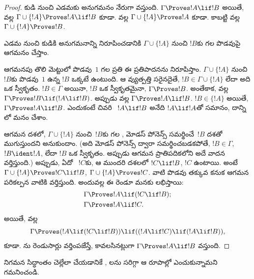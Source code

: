 \documentclass[../../../include/open-logic-section]{subfiles}
\begin{document}
\begin{proof}
కుడి నుంచి ఎడమకు అనుగమనం నేరుగా వస్తుంది. $\Gamma \Proves !A \lif !B$ అయితే,
 వల్ల $\Gamma \cup \{!A\} \Proves !A
\lif !B$ కూడా.  వల్ల $\Gamma \cup
\{!A\} \Proves !A$ కూడా. కాబట్టి  వల్ల $\Gamma \cup
\{!A\} \Proves !B$.

ఎడమ నుంచి కుడికి అనుగమనాన్ని నిరూపించడానికి $\Gamma \cup \{!A\}$ నుంచి $!B$కు గల
 పొడవుపై ఆగమనం చేస్తాం.

ఆగమనపు తొలి మెట్టులో పొడవు~$1$ గల ప్రతి  ఈ ప్రతిపాదనను
నిరూపిస్తాం. $\Gamma \cup \{!A\}$ నుంచి~$!B$కు పొడవు~$1$ ఉన్న
 $!B$ ఒక్కటే ఉంటుంది. ఆ వ్యుత్పత్తి సరైనదైతే,
$!B \in \Gamma \cup \{!A\}$ లేదా అది ఒక స్వీకృతం. $!B \in \Gamma$
అయినా, $!B$ ఒక స్వీకృతమైనా, $\Gamma \Proves !B$. అంతేకాక,
 వల్ల $\Gamma \Proves !B \lif (!A \lif !B)$.
అప్పుడు  వల్ల $\Gamma \Proves !A \lif !B$. $!B \in
\{!A\}$ అయితే, $\Gamma \Proves !A \lif !B$. ఎందుకంటే చివరి
~$!A \lif !B$ అనేది $!A \lif !A$తో సమానం, దాన్ని
లో మనం  చేశాం.

ఆగమన దశలో, $\Gamma \cup \{!A\}$ నుంచి~$!B$కు గల ,
మోడస్ పోనెన్స్ సమర్థించే~$!B$ దశతో ముగుస్తుందని అనుకుందాం.
(అది మోడస్ పోనెన్స్ ద్వారా సమర్థించబడకపోతే, $!B \in \Gamma$,
$!B \ident !A$, లేదా $!B$ ఒక స్వీకృతం. అప్పుడు ఆగమన ప్రాతిపదికలోని
అదే వాదన వర్తిస్తుంది.) అప్పుడు, ఏదో ~$!C$కు,
ఆ  ముందరి దశలలో $!C \lif !B$, $!C$ ఉంటాయి. అంటే
$\Gamma \cup \{!A\} \Proves !C \lif !B$, $\Gamma \cup \{!A\}
\Proves !C$. వాటి  పొడవు తక్కువ కనుక ఆగమన పరికల్పన
వాటికి వర్తిస్తుంది. అందువల్ల ఈ రెండూ మనకు లభిస్తాయి:
\begin{align*}
  & \Gamma \Proves !A \lif (!C \lif !B); \\
  & \Gamma \Proves !A \lif !C.
\end{align*}
అయితే,  వల్ల
\[
\Gamma \Proves (!A \lif (!C \lif !B)) \lif
((!A\lif !C)  \lif (!A \lif !B)),
\]
కూడా. ను రెండుసార్లు వర్తింపజేస్తే, కావలసినట్లుగా
$\Gamma \Proves !A \lif !B$ వస్తుంది.
\end{proof}

నిగమన సిద్ధాంతం చెల్లేలా చేయడానికే ,
లను సరిగ్గా ఆ రూపాల్లో ఎంచుకున్నామని గమనించండి.
\end{document}
